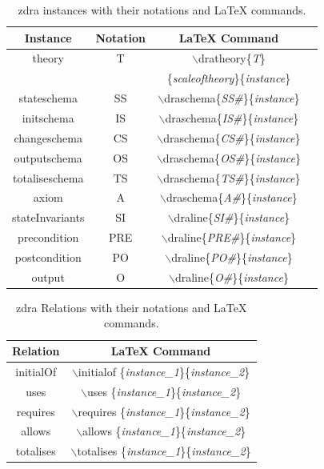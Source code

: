 \begin{table}[H]
\begin{tabular}{| c | c | c | c |}
\hline
\textbf{Instance} & \textbf{Notation} & \textbf{\LaTeX{} Command}  \\
\hline
theory & T & $\backslash$dratheory\{\textit{T}\}\\
& & \{\textit{scaleoftheory}\}\{\textit{instance}\}  \\
\hline
stateschema & SS & $\backslash$draschema\{\textit{SS\#}\}\{\textit{instance}\}
\\
\hline
initschema & IS & $\backslash$draschema\{\textit{IS\#}\}\{\textit{instance}\}
\\
\hline
changeschema & CS & $\backslash$draschema\{\textit{CS\#}\}\{\textit{instance}\}
\\
\hline
outputschema & OS & $\backslash$draschema\{\textit{OS\#}\}\{\textit{instance}\}
\\
\hline
totaliseschema & TS &
$\backslash$draschema\{\textit{TS\#}\}\{\textit{instance}\}  \\
\hline
axiom & A  & $\backslash$draschema\{\textit{A\#}\}\{\textit{instance}\}  \\
\hline
stateInvariants & SI & $\backslash$draline\{\textit{SI\#}\}\{\textit{instance}\}
\\
\hline
precondition & PRE & $\backslash$draline\{\textit{PRE\#}\}\{\textit{instance}\}
\\
\hline
postcondition & PO  & $\backslash$draline\{\textit{PO\#}\}\{\textit{instance}\}
\\
\hline
output & O  & $\backslash$draline\{\textit{O\#}\}\{\textit{instance}\}  \\
\hline
\end{tabular}
\caption{\label{tab:instances} \gls{zdra} instances with their notations and \LaTeX{} commands.}
\end{table}

\begin{table}[H]
\begin{tabular}{| c | c |}
\hline
\textbf{Relation} &  \textbf{\LaTeX{} Command} \\
\hline
initialOf &  $\backslash$initialof
\{\textit{instance\_1}\}\{\textit{instance\_2}\}  \\
\hline
uses & $\backslash$uses \{\textit{instance\_1}\}\{\textit{instance\_2}\}\\
\hline
requires & $\backslash$requires
\{\textit{instance\_1}\}\{\textit{instance\_2}\}\\
\hline
allows & $\backslash$allows \{\textit{instance\_1}\}\{\textit{instance\_2}\}\\
\hline
totalises & $\backslash$totalises
\{\textit{instance\_1}\}\{\textit{instance\_2}\}\\
\hline
\end{tabular}
\caption{\label{tab:relations} \gls{zdra} Relations with their notations and \LaTeX{} commands.}
\end{table}

